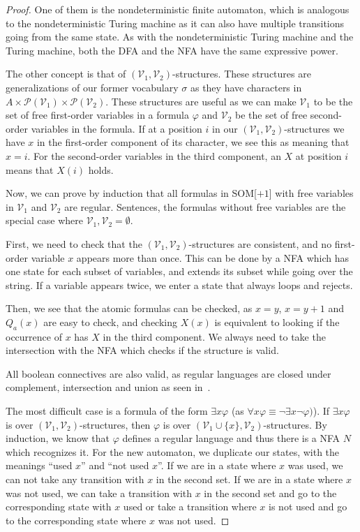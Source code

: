 \begin{proof}
    One of them is the nondeterministic finite automaton, which is analogous to the nondeterministic Turing machine as it can also have multiple transitions going from the same state.
    As with the nondeterministic Turing machine and the Turing machine, both the DFA and the NFA have the same expressive power.

    The other concept is that of $(\mathcal{V}_1, \mathcal{V}_2)$-structures.
    These structures are generalizations of our former vocabulary $\sigma$ as they have characters in $A \times \mathcal{P}(\mathcal{V}_1)\times \mathcal{P}(\mathcal{V}_2)$.
    These structures are useful as we can make $\mathcal{V}_1$ to be the set of free first-order variables in a formula $\varphi$ and $\mathcal{V}_2$ be the set of free second-order variables in the formula.
    If at a position $i$ in our $(\mathcal{V}_1, \mathcal{V}_2)$-structures we have $x$ in the first-order component of its character, we see this as meaning that $x = i$.
    For the second-order variables in the third component, an $X$ at position $i$ means that $X(i)$ holds.

    Now, we can prove by induction that all formulas in SOM[$+1$] with free variables in $\mathcal{V}_1$ and $\mathcal{V}_2$ are regular.
    Sentences, the formulas without free variables are the special case where $\mathcal{V}_1, \mathcal{V}_2 = \emptyset$.

    First, we need to check that the $(\mathcal{V}_1, \mathcal{V}_2)$-structures are consistent, and no first-order variable $x$ appears more than once.
    This can be done by a NFA which has one state for each subset of variables, and extends its subset while going over the string.
    If a variable appears twice, we enter a state that always loops and rejects.

    Then, we see that the atomic formulas can be checked, as $x = y$, $x = y + 1$ and $Q_a(x)$ are easy to check, and checking $X(x)$ is equivalent to looking if the occurrence of $x$ has $X$ in the third component.
    We always need to take the intersection with the NFA which checks if the structure is valid.

    All boolean connectives are also valid, as regular languages are closed under complement, intersection and union as seen in~\cite{theory-cs}.

    The most difficult case is a formula of the form $\exists x \varphi$ (as $\forall x \varphi \equiv \neg \exists x \neg \varphi)$).
    If $\exists x \varphi$ is over $(\mathcal{V}_1, \mathcal{V}_2)$-structures, then $\varphi$ is over $(\mathcal{V}_1 \cup \{x\}, \mathcal{V}_2)$-structures.
    By induction, we know that $\varphi$ defines a regular language and thus there is a NFA $N$ which recognizes it.
    For the new automaton, we duplicate our states, with the meanings ``used $x$'' and ``not used $x$''.
    If we are in a state where $x$ was used, we can not take any transition with $x$ in the second set.
    If we are in a state where $x$ was not used, we can take a transition with $x$ in the second set and go to the corresponding state with $x$ used or take a transition where $x$ is not used and go to the corresponding state where $x$ was not used.


\end{proof}
